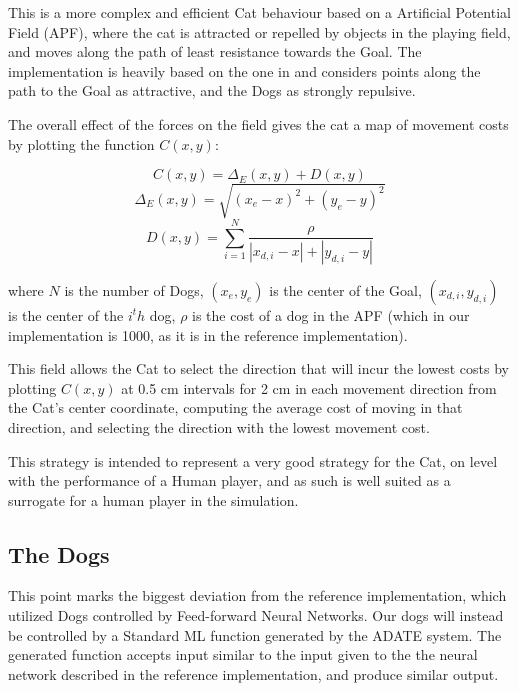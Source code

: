 This is a more complex and efficient Cat behaviour based on a Artificial
Potential Field (APF), where the cat is attracted or repelled by objects in the
playing field, and moves along the path of least resistance towards the Goal.
The implementation is heavily based on the one in
\citet[Chap.~5.1.1.3]{yannakakis2005ai} and considers points along the path to
the Goal as attractive, and the Dogs as strongly repulsive.

The overall effect of the forces on the field gives the cat a map of movement
costs by plotting the function $C(x,y)$:

\begin{equation}
  \label{eq:1}
  C(x,y) = \Delta_E(x,y) + D(x,y)
\end{equation}
\begin{equation}
  \label{eq:2}
  \Delta_E(x,y) = \sqrt{(x_e - x)^2 + (y_e - y)^2}
\end{equation}
\begin{equation}
  \label{eq:3}
  D(x,y) = \sum^N_{i=1} \frac{\rho}{|x_{d,i} - x| + |y_{d,i}-y|}
\end{equation}

where \(N\) is the number of Dogs, \((x_e,y_e)\) is the center of the Goal,
\((x_{d,i},y_{d,i})\) is the center of the \(i^th\) dog, \(\rho\) is the cost of
a dog in the APF (which in our implementation is 1000, as it is in the reference
implementation).

This field allows the Cat to select the direction that will incur the lowest
costs by plotting $C(x,y)$ at 0.5 cm intervals for 2 cm in each movement
direction from the Cat's center coordinate, computing the average cost of moving
in that direction, and selecting the direction with the lowest movement cost.

This strategy is intended to represent a very good strategy for the Cat, on
level with the performance of a Human player, and as such is well suited as a
surrogate for a human player in the simulation.

\subsection{The Dogs}
\label{sec:dogs}

This point marks the biggest deviation from the reference implementation, which
utilized Dogs controlled by Feed-forward Neural Networks.
\citep[Chap.~5.1.2]{yannakakis2005ai} Our dogs will instead be controlled by a
Standard ML function generated by the ADATE system. The generated function accepts
input similar to the input given to the the neural network described in the
reference implementation, and produce similar output.

